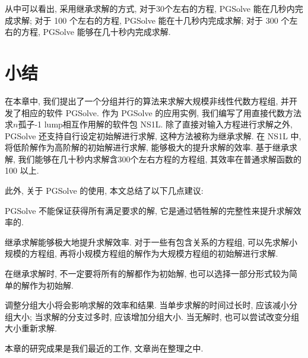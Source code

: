 从中可以看出, 采用继承求解的方式, 对于30个左右的方程, PGSolve 能在几秒内完成求解; 对于 100 个左右的方程, PGSolve 能在十几秒内完成求解; 对于 300 个左右的方程, PGSolve 能够在几十秒内完成求解. 
 

\section{小结}
在本章中, 我们提出了一个分组并行的算法来求解大规模非线性代数方程组, 并开发了相应的软件 PGSolve. 作为 PGSolve 的应用实例, 我们编写了用直接代数方法求$n$孤子-1 lump相互作用解的软件包 NS1L. 除了直接对输入方程进行求解之外, PGSolve 还支持自行设定初始解进行求解, 这种方法被称为继承求解. 在 NS1L 中, 将低阶解作为高阶解的初始解进行求解, 能够极大的提升求解的效率. 基于继承求解, 我们能够在几十秒内求解含300个左右方程的方程组, 其效率在普通求解函数的 100 以上. 



此外, 关于 PGSolve 的使用, 本文总结了以下几点建议:
\begin{compactenum}[(1)]
\item PGSolve 不能保证获得所有满足要求的解, 它是通过牺牲解的完整性来提升求解效率的.
\item 继承求解能够极大地提升求解效率. 对于一些有包含关系的方程组, 可以先求解小规模的方程组, 再将小规模方程组的解作为大规模方程组的初始解进行求解. 
\item 在继承求解时, 不一定要将所有的解都作为初始解, 也可以选择一部分形式较为简单的解作为初始解.
\item 调整分组大小将会影响求解的效率和结果. 当单步求解的时间过长时, 应该减小分组大小; 当求解的分支过多时, 应该增加分组大小. 当无解时, 也可以尝试改变分组大小重新求解. 
\end{compactenum}
 
本章的研究成果是我们最近的工作, 文章尚在整理之中. 
